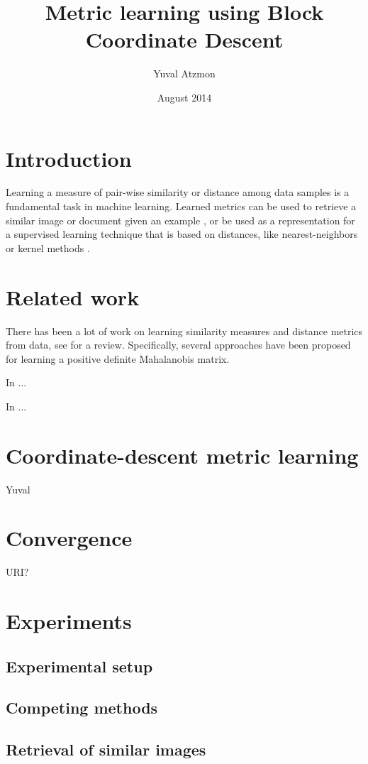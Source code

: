 \documentclass{article}
\title{Metric learning using Block Coordinate Descent}
\author{Yuval Atzmon}
\date{August 2014}
\begin{document}
\maketitle

\section{Introduction}
Learning a measure of pair-wise similarity or distance among data samples is a fundamental task in machine learning. Learned metrics can be used to retrieve a similar image or document given an example \cite{}, or be used as a representation for a supervised learning technique that is based on distances, like nearest-neighbors or kernel methods \cite{}.


\section{Related work}
There has been a lot of work on learning similarity measures and distance metrics from data, see \cite{} for a review. Specifically, several approaches have been proposed for learning a positive definite Mahalanobis matrix. 

In \cite{} ...


In \cite{} ...


\section{Coordinate-descent metric learning}
Yuval


\section{Convergence}
URI?

\section{Experiments}
\subsection{Experimental setup}
\subsection{Competing methods}
\subsection{Retrieval of similar images}
\end{document}
